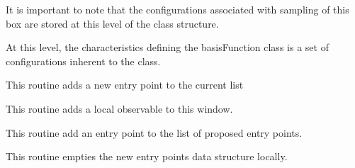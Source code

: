 \documentclass[letterpaper,10pt,english]{sphinxmanual}
\begin{document}
\begin{fulllineitems}
\label{applications/applications.doc:basisFunctions.basisFunction}
It is important to note that the configurations associated with 
sampling of this box are stored at this level of the class structure.

At this level, the characteristics defining the basisFunction class is
a set of configurations inherent to the class.

\begin{fulllineitems}
\label{applications/applications.doc:basisFunctions.basisFunction.add_entry_point}
This routine adds a new entry point to the current list

\end{fulllineitems}


\begin{fulllineitems}
\label{applications/applications.doc:basisFunctions.basisFunction.add_local_obserbale}
This routine adds a local observable to this window.

\end{fulllineitems}


\begin{fulllineitems}
\label{applications/applications.doc:basisFunctions.basisFunction.add_new_entry_point}
This routine add an entry point to the list of proposed entry points.

\end{fulllineitems}


\begin{fulllineitems}
\label{applications/applications.doc:basisFunctions.basisFunction.empty_new_entry_points}
This routine empties the new entry points data structure locally.


\end{fulllineitems}
\end{fulllineitems}
\end{document}
